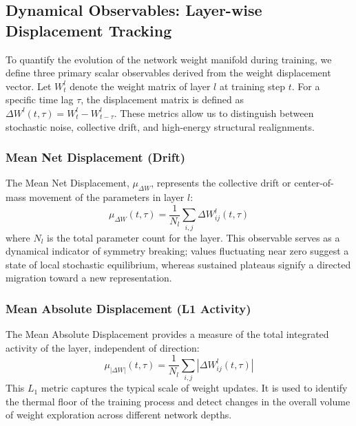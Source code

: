 \documentclass[11pt,a4paper]{article}
\begin{document}
\subsection{Dynamical Observables: Layer-wise Displacement Tracking}

To quantify the evolution of the network weight manifold during training, we define three primary scalar observables derived from the weight displacement vector. Let $W^l_t$ denote the weight matrix of layer $l$ at training step $t$. For a specific time lag $\tau$, the displacement matrix is defined as $\Delta W^l(t, \tau) = W^l_t - W^l_{t-\tau}$. These metrics allow us to distinguish between stochastic noise, collective drift, and high-energy structural realignments.

\subsubsection{Mean Net Displacement (Drift)}
The Mean Net Displacement, $\mu_{\Delta W}$, represents the collective drift or center-of-mass movement of the parameters in layer $l$:
\begin{equation}
    \mu_{\Delta W}(t, \tau) = \frac{1}{N_l} \sum_{i,j} \Delta W^l_{ij}(t, \tau)
\end{equation}
where $N_l$ is the total parameter count for the layer. This observable serves as a dynamical indicator of symmetry breaking; values fluctuating near zero suggest a state of local stochastic equilibrium, whereas sustained plateaus signify a directed migration toward a new representation.

\subsubsection{Mean Absolute Displacement (L1 Activity)}
The Mean Absolute Displacement provides a measure of the total integrated activity of the layer, independent of direction:
\begin{equation}
    \mu_{|\Delta W|}(t, \tau) = \frac{1}{N_l} \sum_{i,j} |\Delta W^l_{ij}(t, \tau)|
\end{equation}
This $L_1$ metric captures the typical scale of weight updates. It is used to identify the thermal floor of the training process and detect changes in the overall volume of weight exploration across different network depths.
\end{document}
